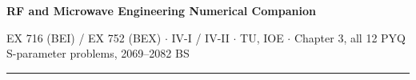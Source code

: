 \documentclass[10pt]{article}
\begin{document}
{\LARGE\bfseries RF and Microwave Engineering \gap\textcolor{sub}{Numerical Companion}}\par
{\footnotesize\color{sub} EX 716 (BEI) / EX 752 (BEX) $\cdot$ IV-I / IV-II $\cdot$ TU, IOE
$\cdot$ Chapter 3, all 12 PYQ S-parameter problems, 2069--2082 BS}
\vspace{3pt}\hrule\vspace{4pt}

\setcounter{section}{2}



\end{document}
